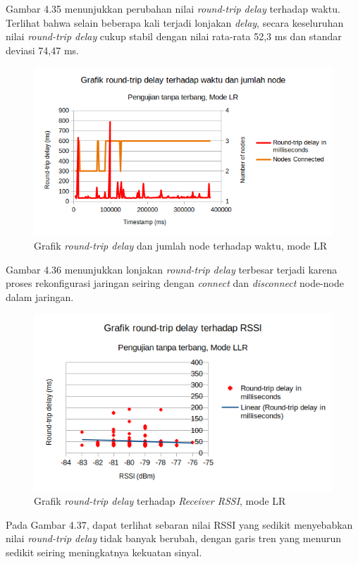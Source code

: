 Gambar 4.35 menunjukkan perubahan nilai \textit{round-trip delay} terhadap waktu. Terlihat bahwa selain beberapa kali terjadi lonjakan \textit{delay}, secara keseluruhan nilai \textit{round-trip delay} cukup stabil dengan nilai rata-rata 52,3 ms dan standar deviasi 74,47 ms.
\begin{figure}[H]
	\centering
	\includegraphics[scale=0.7]{./assets/Graphs/NoFly_LR/Delay-Nodes}
	\caption{Grafik \textit{round-trip delay} dan jumlah node terhadap waktu, mode LR}
\end{figure}
Gambar 4.36 menunjukkan lonjakan \textit{round-trip delay} terbesar terjadi karena proses rekonfigurasi jaringan seiring dengan \textit{connect} dan \textit{disconnect} node-node dalam jaringan.
\begin{figure}[H]
	\centering
	\includegraphics[scale=0.7]{./assets/Graphs/NoFly_LR/Delay-RSSI}
	\caption{Grafik \textit{round-trip delay} terhadap \textit{Receiver RSSI}, mode LR}
\end{figure}
Pada Gambar 4.37, dapat terlihat sebaran nilai RSSI yang sedikit menyebabkan nilai \textit{round-trip delay} tidak banyak berubah, dengan garis tren yang menurun sedikit seiring meningkatnya kekuatan sinyal.
